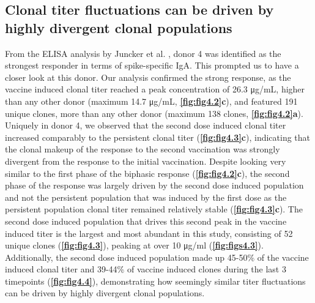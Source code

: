 \subsection{Clonal titer fluctuations can be driven by highly divergent clonal populations}
From the ELISA analysis by Juncker et al. \cite{juncker2022comparing}, donor 4 was identified as the strongest responder in terms of spike-specific IgA. This prompted us to have a closer look at this donor. Our analysis confirmed the strong response, as the vaccine induced clonal titer reached a peak concentration of 26.3 μg/mL, higher than any other donor (maximum 14.7 μg/mL, \textbf{\autoref{fig:fig4.2}c}), and featured 191 unique clones, more than any other donor (maximum 138 clones, \textbf{\autoref{fig:fig4.2}a}).
Uniquely in donor 4, we observed that the second dose induced clonal titer increased comparably to the persistent clonal titer (\textbf{\autoref{fig:fig4.3}c}), indicating that the clonal makeup of the response to the second vaccination was strongly divergent from the response to the initial vaccination. Despite looking very similar to the first phase of the biphasic response (\textbf{\autoref{fig:fig4.2}c}), the second phase of the response was largely driven by the second dose induced population and not the persistent population that was induced by the first dose as the persistent population clonal titer remained relatively stable (\textbf{\autoref{fig:fig4.3}c}). The second dose induced population that drives this second peak in the vaccine induced titer is the largest and most abundant in this study, consisting of 52 unique clones (\textbf{\autoref{fig:fig4.3}}), peaking at over 10 μg/ml (\textbf{\autoref{fig:figs4.3}}). Additionally, the second dose induced population made up 45-50\% of the vaccine induced clonal titer and 39-44\% of vaccine induced clones during the last 3 timepoints (\textbf{\autoref{fig:fig4.4}}), demonstrating how seemingly similar titer fluctuations can be driven by highly divergent clonal populations.
